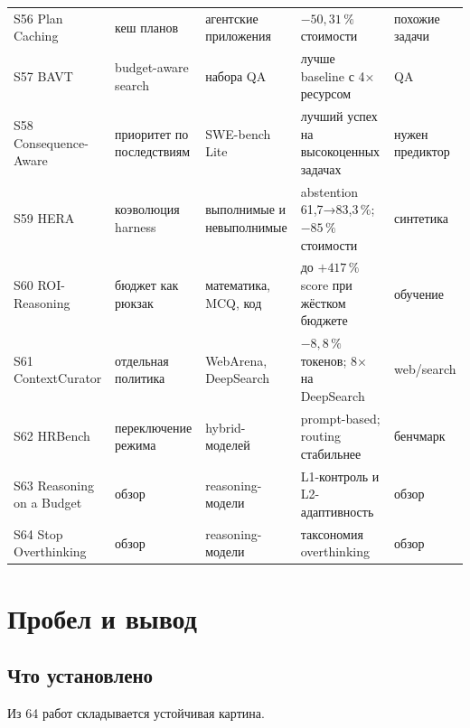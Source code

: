\documentclass[11pt,a4paper]{article}
\begin{document}
{\begin{longtable}{@{}>{\raggedright\arraybackslash}p{2.6cm}>{\raggedright\arraybackslash}p{3.2cm}>{\raggedright\arraybackslash}p{3.2cm}>{\raggedright\arraybackslash}p{3.4cm}>{\raggedright\arraybackslash}p{3.0cm}@{}}
S56 Plan Caching \cite{zhang2025agenticplan} & кеш планов & агентские приложения & $-50{,}31\,\%$ стоимости & похожие задачи \\
S57 BAVT \cite{li2026spendreason} & budget-aware search & 4 набора QA & лучше baseline с 4× ресурсом & QA \\
S58 Consequence-Aware \cite{he2026allerrors} & приоритет по последствиям & SWE-bench Lite & лучший успех на высокоценных задачах & нужен предиктор \\
S59 HERA \cite{luo2026heraharness} & коэволюция harness & выполнимые и невыполнимые & abstention 61{,}7→83{,}3\,\%; $-85\,\%$ стоимости & синтетика \\
S60 ROI-Reasoning \cite{zhao2026roireasoning} & бюджет как рюкзак & математика, MCQ, код & до $+417\,\%$ score при жёстком бюджете & обучение \\
S61 ContextCurator \cite{li2026escapingcontext} & отдельная политика & WebArena, DeepSearch & $-8{,}8\,\%$ токенов; 8× на DeepSearch & web/search \\
S62 HRBench \cite{ning2026hrbenchbenchmarkin} & переключение режима & 6 hybrid-моделей & prompt-based; routing стабильнее & бенчмарк \\
S63 Reasoning on a Budget \cite{alomrani2025reasoningbudget} & обзор & reasoning-модели & L1-контроль и L2-адаптивность & обзор \\
S64 Stop Overthinking \cite{sui2025stopoverthinking} & обзор & reasoning-модели & таксономия overthinking & обзор \\
\end{longtable}
}

\section{Пробел и вывод}

\subsection{Что установлено}

Из 64 работ складывается устойчивая картина.
\end{document}
